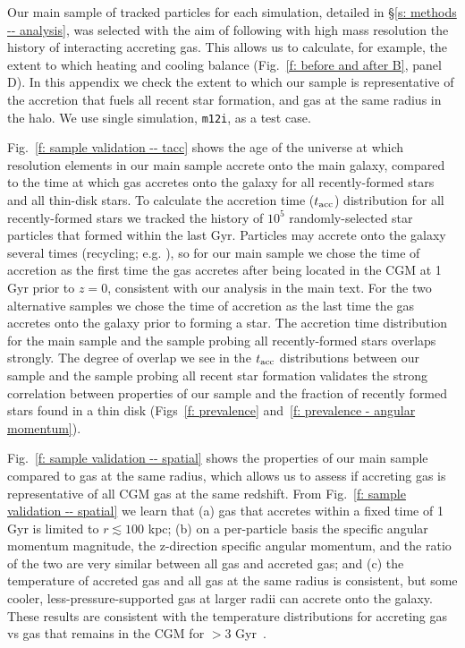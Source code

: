 \documentclass[fleqn,usenatbib]{mnras}
\newcommand{\tacc}{t_{\rm acc}}
\begin{document}
Our main sample of tracked particles for each simulation, detailed in \S\ref{s: methods -- analysis}, was selected with the aim of following with high mass resolution the history of interacting accreting gas.
This allows us to calculate, for example, the extent to which heating and cooling balance (Fig.~\ref{f: before and after B}, panel D).
In this appendix we check the extent to which our sample is representative of the accretion that fuels all recent star formation, and gas at the same radius in the halo.
We use single simulation, \texttt{m12i}, as a test case.

Fig.~\ref{f: sample validation -- tacc} shows the age of the universe at which resolution elements in our main sample accrete onto the main galaxy, compared to the time at which gas accretes onto the galaxy for all recently-formed stars and all thin-disk stars.
To calculate the accretion time ($\tacc$) distribution for all recently-formed stars we tracked the history of $10^5$ randomly-selected star particles that formed within the last Gyr.
Particles may accrete onto the galaxy several times (recycling; e.g. \citealt{Angles-Alcazar2017}), so for our main sample we chose the time of accretion as the first time the gas accretes after being located in the CGM at 1 Gyr prior to $z=0$, consistent with our analysis in the main text.
For the two alternative samples we chose the time of accretion as the last time the gas accretes onto the galaxy prior to forming a star.
The accretion time distribution for the main sample and the sample probing all recently-formed stars overlaps strongly.
The degree of overlap we see in the $\tacc$ distributions between our sample and the sample probing all recent star formation validates the strong correlation between properties of our sample and the fraction of recently formed stars found in a thin disk (Figs~\ref{f: prevalence} and~\ref{f: prevalence - angular momentum}).

Fig.~\ref{f: sample validation -- spatial} shows the properties of our main sample compared to gas at the same radius, which allows us to assess if accreting gas is representative of all CGM gas at the same redshift.
From Fig.~\ref{f: sample validation -- spatial} we learn that (a) gas that accretes within a fixed time of 1 Gyr is limited to $r \lesssim 100$ kpc;
(b) on a per-particle basis the specific angular momentum magnitude, the z-direction specific angular momentum, and the ratio of the two are very similar between all gas and accreted gas;
and (c) the temperature of accreted gas and all gas at the same radius is consistent, but some cooler, less-pressure-supported gas at larger radii can accrete onto the galaxy.
These results are consistent with the temperature distributions for accreting gas vs gas that remains in the CGM for $>3$ Gyr~\citep{Hafen2020}.
\end{document}
